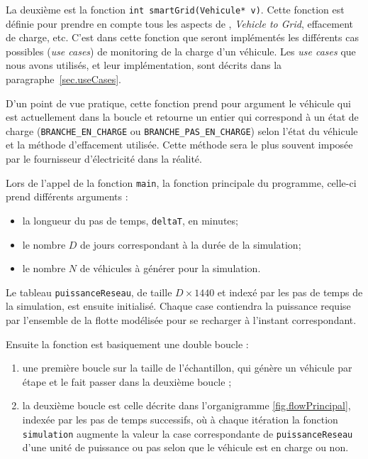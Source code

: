 			La deuxième est la fonction \lstinline{int smartGrid(Vehicule* v)}. Cette fonction est définie pour prendre en compte tous les aspects de \smartgrid{}, \emph{Vehicle to Grid}, effacement de charge, etc. C'est dans cette fonction que seront implémentés les différents cas possibles (\emph{use cases}) de monitoring de la charge d'un véhicule. Les \emph{use cases} que nous avons utilisés, et leur implémentation, sont décrits dans la paragraphe~\vref{sec.useCases}. 
			
			D'un point de vue pratique, cette fonction prend pour argument le véhicule qui est actuellement dans la boucle et retourne un entier qui correspond à un état de charge (\lstinline{BRANCHE_EN_CHARGE} ou \lstinline{BRANCHE_PAS_EN_CHARGE}) selon l'état du véhicule et la méthode d'effacement utilisée. Cette méthode sera le plus souvent imposée par le fournisseur d’électricité dans la réalité.
			
			\bigskip
			
			Lors de l'appel de la fonction \lstinline{main}, la fonction principale du programme, celle-ci prend différents arguments :
			\begin{itemize}
			\item la longueur du pas de temps, \lstinline{deltaT}, en minutes;
			\item le nombre $D$ de jours correspondant à la durée de la simulation;
			\item le nombre $N$ de véhicules à générer pour la simulation.
			\end{itemize}
			
			Le tableau \lstinline{puissanceReseau}, de taille $D \times 1440$ et indexé par les pas de temps de la simulation, est ensuite initialisé. Chaque case contiendra la puissance requise par l'ensemble de la flotte modélisée pour se recharger à l'instant correspondant.
			
			Ensuite la fonction est basiquement une double boucle :
			\begin{enumerate}
			\item une première boucle sur la taille de l'échantillon, qui génère un véhicule par étape et le fait passer dans la deuxième boucle ;
			\item la deuxième boucle est celle décrite dans l'organigramme \vref{fig.flowPrincipal}, indexée par les pas de temps successifs, où à chaque itération la fonction \lstinline{simulation} augmente la valeur la case correspondante de \lstinline{puissanceReseau} d'une unité de puissance ou pas selon que le véhicule est en charge ou non.
			\end{enumerate}
			

